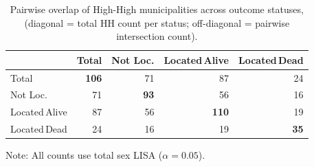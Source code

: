 \begin{table}[htbp]
\centering
\caption{Pairwise overlap of High-High municipalities across outcome statuses,  (diagonal = total HH count per status; off-diagonal = pairwise intersection count).}\label{tab:crosstab}
\begin{tabular}{lrrrr}
  \toprule
  & \textbf{Total} & \textbf{Not Loc.} & \textbf{Located\,Alive} & \textbf{Located\,Dead} \\
  \midrule
  Total & \textbf{106} & 71 & 87 & 24 \\
  Not Loc. & 71 & \textbf{93} & 56 & 16 \\
  Located\,Alive & 87 & 56 & \textbf{110} & 19 \\
  Located\,Dead & 24 & 16 & 19 & \textbf{35} \\
  \bottomrule
\end{tabular}
\begin{tablenotes}
\small
\item Note: All counts use total sex LISA ($\alpha=0.05$).
\end{tablenotes}
\end{table}
